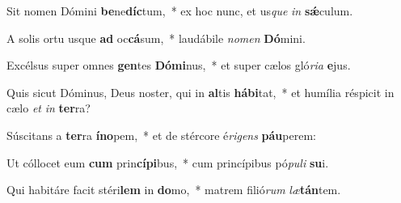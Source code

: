 \item Sit nomen Dómini \textbf{be}ne\textbf{díc}tum,~* ex hoc nunc, et us\textit{que} \textit{in} \textbf{sǽ}culum.
\item A solis ortu usque \textbf{ad} oc\textbf{cá}sum,~* laudábile \textit{no}\textit{men} \textbf{Dó}mini.
\item Excélsus super omnes \textbf{gen}tes \textbf{Dó}\textbf{mi}nus,~* et super cælos gló\textit{ri}\textit{a} \textbf{e}jus.
\item Quis sicut Dóminus, Deus noster, qui in \textbf{al}tis \textbf{há}\textbf{bi}tat,~* et humília réspicit in cælo \textit{et} \textit{in} \textbf{ter}ra?
\item Súscitans a \textbf{ter}ra \textbf{ín}\textbf{o}pem,~* et de stércore é\textit{ri}\textit{gens} \textbf{páu}perem:
\item Ut cóllocet eum \textbf{cum} prin\textbf{cí}\textbf{pi}bus,~* cum princípibus pó\textit{pu}\textit{li} \textbf{su}i.
\item Qui habitáre facit stéri\textbf{lem} in \textbf{do}mo,~* matrem filió\textit{rum} \textit{læ}\textbf{tán}tem.

